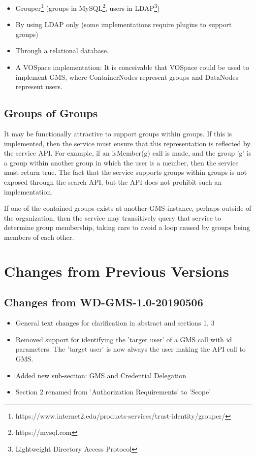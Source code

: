 \documentclass[11pt,a4paper]{ivoa}
\begin{document}
\begin{itemize}
\item Grouper\footnote{https://www.internet2.edu/products-services/trust-identity/grouper/} (groups in MySQL\footnote{https://mysql.com}, users in LDAP\footnote{Lightweight Directory Access Protocol})
\item By using LDAP only (some implementations require plugins to support groups)
\item Through a relational database.
\item A VOSpace implementation: It is conceivable that VOSpace could be used to implement GMS, where ContainerNodes represent groups and DataNodes represent users.
\end{itemize}

\subsection{Groups of Groups}
\label{subsec:groupsofgroups}

It may be functionally attractive to support groups within groups.  If this is implemented, then the service must ensure that this representation is reflected by the service API.  For example, if an isMember(g) call is made, and the group 'g' is a group within another group in which the user is a member, then the service must return true.  The fact that the service supports groups within groups is not exposed through the search API, but the API does not prohibit such an implementation.

If one of the contained groups exists at another GMS instance, perhaps outside of the organization, then the service may transitively query that service to determine group membership, taking care to avoid a loop caused by groups being members of each other.

\appendix

\section{Changes from Previous Versions}
\label{sec:changehistory}

\subsection{Changes from WD-GMS-1.0-20190506}
\begin{itemize}
\item{General text changes for clarification in abstract and sections 1, 3}
\item{Removed support for identifying the 'target user' of a GMS call with id parameters.  The 'target user' is now always the user making the API call to GMS.}
\item{Added new sub-section: GMS and Credential Delegation}
\item{Section 2 renamed from 'Authorization Requirements' to 'Scope'}
\end{itemize}
\end{document}

